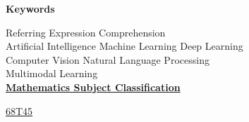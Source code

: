 \begin{center}


  \bigskip\smallskip
  \textbf{Keywords}

  Referring Expression Comprehension\\
  Artificial Intelligence \textbullet{} Machine Learning \textbullet{} Deep
  Learning\\
  Computer Vision \textbullet{} Natural Language Processing\\
  Multimodal Learning\\

  \bigskip
  \href{https://mathscinet.ams.org/msc/msc2010.html}{\textbf{Mathematics
      Subject Classification}}

  \href{https://mathscinet.ams.org/msc/msc2010.html?t=68Txx}{68T45}
\end{center}

\vfill\null


\clearpage
\thispagestyle{plain}
\null\vfill

